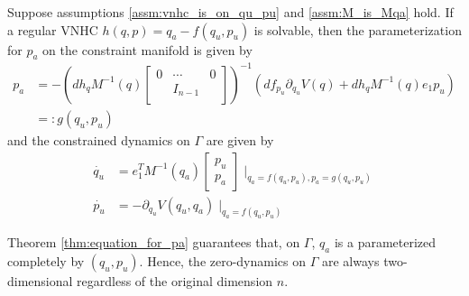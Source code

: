 \begin{thm}\label{thm:equation_for_pa}
Suppose assumptions \ref{assm:vnhc_is_on_qu_pu} and \ref{assm:M_is_Mqa} hold.
If a regular VNHC \(h(q,p) = q_a - f(q_u,p_u)\) is solvable, then the
parameterization for \(p_a\) on the constraint manifold is given by
\begin{align*}
p_a &= -\left(dh_q M^{-1}(q) \begin{bmatrix}
    0 & \cdots & 0 \\
    & I_{n-1} & \\
    \end{bmatrix}\right)^{-1}\left( df_{p_u}\partial_{q_u}V(q) + dh_q M^{-1}(q)e_1 p_u\right) \\
    &=: g(q_u,p_u)
\end{align*}
and the constrained dynamics on \(\Gamma\) are given by
\begin{align*}
    \dot{q_u} &= e_1^T M^{-1}(q_a) \begin{bmatrix}
    p_u \\
    p_a
    \end{bmatrix}\mid_{q_a = f(q_u,p_u), p_a = g(q_u,p_u)} \\
    \dot{p_u} &= -\partial_{q_u} V(q_u,q_a) \mid_{q_a = f(q_u,p_u)}
\end{align*}
\end{thm}

Theorem \ref{thm:equation_for_pa} guarantees that, on \(\Gamma\), \(q_a\) is a
parameterized completely by \((q_u,p_u)\). Hence, the zero-dynamics on
\(\Gamma\) are always two-dimensional regardless of the original dimension
\(n\).
